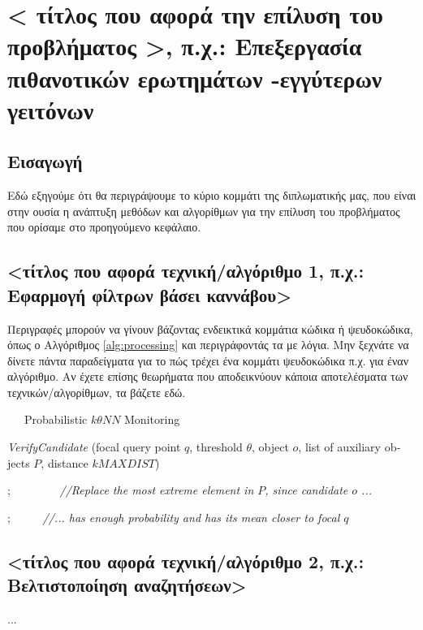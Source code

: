 \chapter{< τίτλος που αφορά την επίλυση του προβλήματος >, π.χ.: Επεξεργασία πιθανοτικών ερωτημάτων -εγγύτερων γειτόνων}
\label{chap5}

\section{Εισαγωγή}

Εδώ εξηγούμε ότι θα περιγράψουμε το κύριο κομμάτι της διπλωματικής μας, που είναι στην ουσία η ανάπτυξη μεθόδων και αλγορίθμων για την επίλυση του προβλήματος που ορίσαμε στο προηγούμενο κεφάλαιο. 

\section{<τίτλος που αφορά τεχνική/αλγόριθμο 1, π.χ.: Εφαρμογή φίλτρων βάσει καννάβου>}

Περιγραφές μπορούν να γίνουν βάζοντας ενδεικτικά κομμάτια κώδικα ή ψευδοκώδικα, όπως ο Αλγόριθμος \ref{alg:processing} και περιγράφοντάς τα με λόγια. Μην ξεχνάτε να δίνετε πάντα παραδείγματα για το πώς τρέχει ένα κομμάτι ψευδοκώδικα π.χ. για έναν αλγόριθμο.
Αν έχετε επίσης θεωρήματα που αποδεικνύουν κάποια αποτελέσματα των τεχνικών/αλγορίθμων, τα βάζετε εδώ. 

\begin{otherlanguage}{english}
\begin{algorithm}
\caption{\ \ \ Probabilistic $k\theta NN$ Monitoring}
\begin{algorithmic}[1]
\begin{footnotesize}

 {\em VerifyCandidate} (focal query point $q$, threshold $\theta$, object $o$, list of auxiliary objects $P$, distance $kMAXDIST$) 


;   \ \ \ \ \ \ \ \ {\em //Replace the most extreme element in $P$, since candidate $o$ ... }

;  \ \ \ \ \ {\em //... has enough probability and has its mean closer to focal $q$ }

\ENDIF



\end{footnotesize}
\end{algorithmic}
\label{alg:processing}
\end{algorithm}
\end{otherlanguage}


\section{<τίτλος που αφορά τεχνική/αλγόριθμο 2, π.χ.: Βελτιστοποίηση αναζητήσεων>}

...


